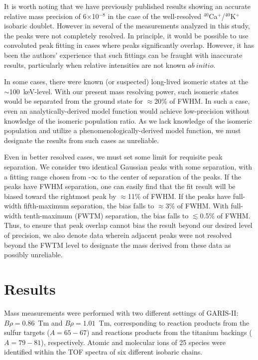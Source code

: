 \documentclass[3p]{elsarticle}
\begin{document}
It is worth noting that we have previously published results showing an accurate relative mass precision of 6$\times$10$^{-8}$ \citep{Schury2014} in the case of the well-resolved $^{40}$Ca$^+$/$^{40}$K$^+$ isobaric doublet. However in several of the measurements analyzed in this study, the peaks were not completely resolved.  In principle, it would be possible to use convoluted peak fitting in cases where peaks significantly overlap.  However, it has been the authors' experience that such fittings can be fraught with inaccurate results, particularly when relative intensities are not known $ab~initio$.

In some cases, there were known (or suspected) long-lived isomeric states at the $\sim$100~keV-level.  With our present mass resolving power, such isomeric states would be separated from the ground state for $\approx$20\% of FWHM.  In such a case, even an analytically-derived model function would achieve low-precision without knowledge of the isomeric population ratio.  As we lack knowledge of the isomeric population and utilize a phenomenologically-derived model function, we must designate the results from such cases as unreliable.

Even in better resolved cases, we must set some limit for requisite peak separation.  We consider two identical Gaussian peaks with some separation, with a fitting range chosen from -$\infty$ to the center of separation of the peaks.  If the peaks have FWHM separation, one can easily find that the fit result will be biased toward the rightmost peak by $\approx$11\% of FWHM.  If the peaks have full-width fifth-maximum separation, the bias falls to $\approx$3\%  of FWHM.  With full-width tenth-maximum (FWTM) separation, the bias falls to $\lesssim$0.5\%  of FWHM.  Thus, to ensure that peak overlap cannot bias the result beyond our desired level of precision, we also denote data wherein adjacent peaks were not resolved beyond the FWTM level to designate the mass derived from these data as possibly unreliable.


\section{Results}

Mass measurements were performed with two different settings of GARIS-II:  $B\rho = 0.86$~Tm and $B\rho = 1.01$~Tm, corresponding to reaction products from the sulfur targets ($A = 65-67$) and reactions products from the titanium backings ($A = 79-81$), respectively. Atomic and molecular ions of 25 species were identified within the TOF spectra of six different isobaric chains. 
\end{document}
